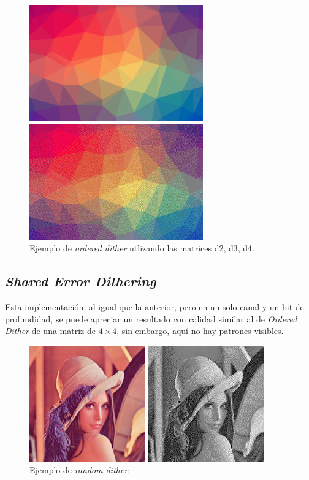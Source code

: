 \documentclass[conference]{IEEEtran}
\begin{document}
\begin{figure}[htbp]
\centerline{\includegraphics[height=50mm]{code/colors}}
\centerline{\includegraphics[height=50mm]{code/colors1}}
\caption{Ejemplo de \textit{ordered dither} utlizando las matrices d2, d3, d4.}
\label{errorColorTriangle}
\end{figure}

\subsection{\textit{Shared Error Dithering}}

Esta implementación, al igual que la anterior, pero en un solo canal y un bit de profundidad, se puede apreciar un resultado con calidad similar al de \textit{Ordered Dither} de una matriz de $4\times 4$, sin embargo, aquí no hay patrones visibles.

\begin{figure}[htbp]
\centerline{\includegraphics[height=50mm]{code/lena}}
\centerline{\includegraphics[height=50mm]{code/error_dither_lena}}
\caption{Ejemplo de \textit{random dither}.}
\label{errorGray}
\end{figure}
\end{document}
